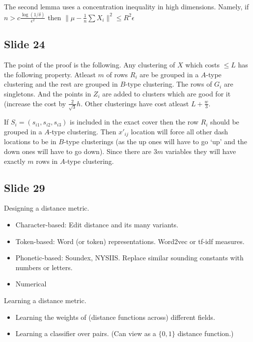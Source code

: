 \documentclass[12pt]{article}
\begin{document}
The second lemma uses a concentration inequality in high dimensions. Namely, if $n > c\frac{\log (1/\delta)}{\epsilon^2}$ then $\|\mu - \frac{1}{n}\sum X_i\|^2 \le R^2 \epsilon$ 

\subsection*{Slide 24}
The point of the proof is the following. Any clustering of $X$ which costs $\le L$ has the following property. Atleast $m$ of rows $R_i$ are be grouped in a $A$-type clustering and the rest are grouped in $B$-type clustering. The rows of $G_i$ are singletons. And the points in $Z_i$ are added to clusters which are good for it (increase the cost by $\frac{2}{\sqrt{3}}h$. Other clusterings have cost atleast $L + \frac{w}{3}$. 

If $S_i = (s_{i1}, s_{i2}, s_{i3})$ is included in the exact cover then the row $R_i$ should be grouped in a $A$-type clustering. Then $x'_{ij}$ location will force all other dash locations to be in $B$-type clusterings (as the up ones will have to go `up' and the down ones will have to go down). Since there are $3m$ variables they will have exactly $m$ rows in $A$-type clustering. 

\subsection*{Slide 29}
Designing a distance metric.
\begin{itemize}
	\item Character-based: Edit distance and its many variants.
	\item Token-based: Word (or token) representations. Word2vec or tf-idf measures.
	\item Phonetic-based: Soundex, NYSIIS. Replace similar sounding constants with numbers or letters.
	\item Numerical
\end{itemize}
Learning a distance metric.
\begin{itemize}
	\item Learning the weights of (distance functions across) different fields.
	\item Learning a classifier over pairs. (Can view as a $\{0, 1\}$ distance function.)
\end{itemize}
\end{document}
